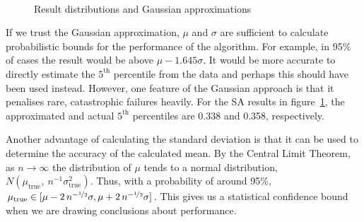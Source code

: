 \documentclass[10pt]{article}
\begin{document}
\begin{figure}
  \begin{center}
    \mbox{
    }
    \end{center}
    \caption{Result distributions and Gaussian approximations}
    \label{fig:result_dist}
    \end{figure}

If we trust the Gaussian approximation, $\mu$ and $\sigma$ are sufficient to
calculate probabilistic bounds for the performance of the algorithm. For
example, in 95\% of cases the result would be above $\mu - 1.645 \sigma$. It
would be more accurate to directly estimate the $5^\textrm{th}$ percentile
from the data and perhaps this should have been used instead. However, one
feature of the Gaussian approach is that it penalises rare, catastrophic
failures heavily.  For the SA results in figure~\ref{fig:result_dist}, the
approximated and actual $5^\textrm{th}$  percentiles are 0.338 and 0.358,
respectively.

Another advantage of calculating the standard deviation is that it can be used
to determine the accuracy of the calculated mean. By the Central Limit
Theorem, as $n \rightarrow \infty$ the distribution of $\mu$ tends to a normal
distribution, $N(\mu_\textrm{true},\ n^{-1}\sigma_\textrm{true}^2)$. Thus,
with a probability of around 95\%,
$\mu_\textrm{true} \in
[\mu-2\,n^{-\nicefrac{1}{2}}\sigma, \mu+2\,n^{-\nicefrac{1}{2}}\sigma]$. This
gives us a statistical confidence bound when we are drawing conclusions about
performance.
\end{document}
